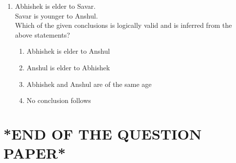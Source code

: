 \documentclass[journal]{IEEEtran}
\theoremstyle{remark}
\begin{document}
\begin{enumerate}
\item  Abhishek is elder to Savar. \\
Savar is younger to Anshul. \\
Which of the given conclusions is logically valid and is inferred from the above
statements? 

\hfill{}


\begin{enumerate}
\item  Abhishek is elder to Anshul 
\item   Anshul is elder to Abhishek 
\item   Abhishek and Anshul are of the same age 
\item No conclusion follows 
\end{enumerate}




\end{enumerate}
\section*{*END OF THE QUESTION PAPER*}
 
\end{document}
